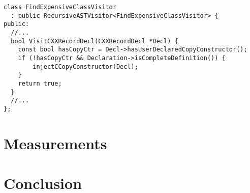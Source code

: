 \documentclass{article}
\begin{document}
\begin{verbatim}
class FindExpensiveClassVisitor
  : public RecursiveASTVisitor<FindExpensiveClassVisitor> {
public:
  //...
  bool VisitCXXRecordDecl(CXXRecordDecl *Decl) {
  	const bool hasCopyCtr = Decl->hasUserDeclaredCopyConstructor();   
    if (!hasCopyCtr && Declaration->isCompleteDefinition()) {
        injectCCopyConstructor(Decl);
    }
    return true;
  }
  //...  
};
\end{verbatim}



\section{Measurements}
\label{measurements}

\section{Conclusion}
\label{conc}
\end{document}
